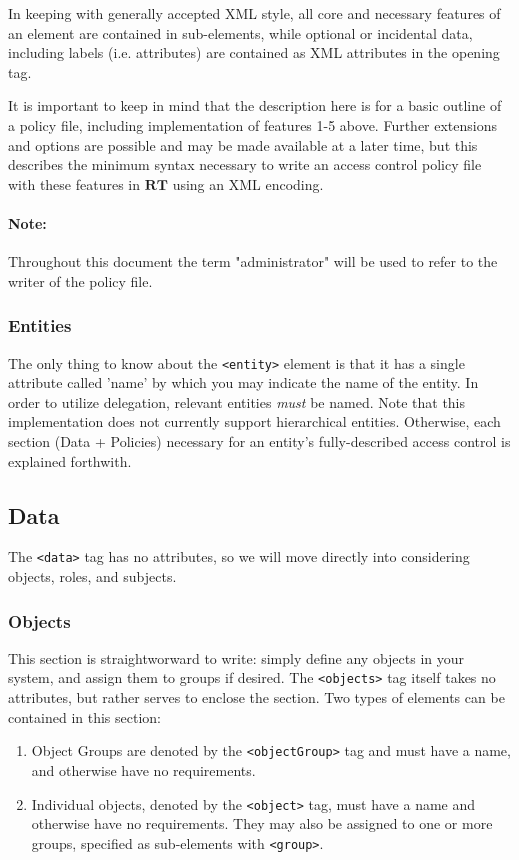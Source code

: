 \documentclass{article}
\providecommand{\tightlist}{
    \setlength{\itemsep}{1pt}\setlength{\parskip}{0pt}
}
\providecommand{\inlinecode}{\texttt}
\providecommand{\RT}{\textbf{RT}}
\begin{document}
In keeping with generally accepted XML style, all core and necessary features of an element are contained in sub-elements, while optional or incidental data, including labels (i.e. attributes) are contained as XML attributes in the opening tag. \par

It is important to keep in mind that the description here is for a basic outline of a policy file, including implementation of features 1-5 above. Further extensions and options are possible and may be made available at a later time, but this describes the minimum syntax necessary to write an access control policy file with these features in $\RT$ using an XML encoding.

\paragraph{Note:} Throughout this document the term "administrator" will be used to refer to the writer of the policy file.


\subsubsection{Entities}
The only thing to know about the \inlinecode{<entity>} element is that it has a single attribute called 'name' by which you may indicate the name of the entity. In order to utilize delegation, relevant entities \textit{must} be named. Note that this implementation does not currently support hierarchical entities. Otherwise, each section (Data + Policies) necessary for an entity's fully-described access control is explained forthwith.

\subsection{Data}
The \inlinecode{<data>} tag has no attributes, so we will move directly into considering objects, roles, and subjects.

\subsubsection{Objects}
This section is straightworward to write: simply define any objects in your system, and assign them to groups if desired.
The \inlinecode{<objects>} tag itself takes no attributes, but rather serves to enclose the section. Two types of elements can be contained in this section:
\begin{enumerate}\tightlist
  \item Object Groups are denoted by the \inlinecode{<objectGroup>} tag and must have a name, and otherwise have no requirements.
  \item Individual objects, denoted by the \inlinecode{<object>} tag, must have a name and otherwise have no requirements. They may also be assigned to one or more groups, specified as sub-elements with \inlinecode{<group>}.
\end{enumerate}
\end{document}
